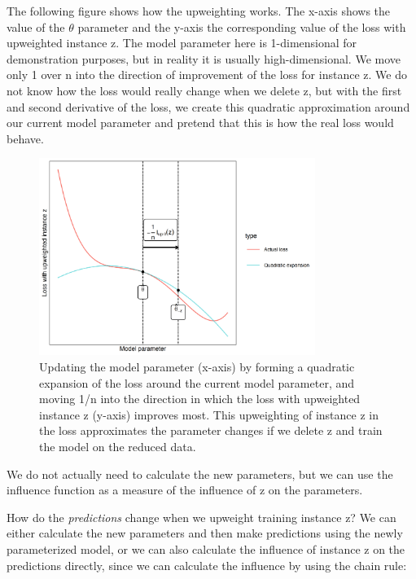 \documentclass[
  10pt,
]{scrbook}
\begin{document}
The following figure shows how the upweighting works.
The x-axis shows the value of the \(\theta\) parameter and the y-axis the corresponding value of the loss with upweighted instance z.
The model parameter here is 1-dimensional for demonstration purposes, but in reality it is usually high-dimensional.
We move only 1 over n into the direction of improvement of the loss for instance z.
We do not know how the loss would really change when we delete z, but with the first and second derivative of the loss, we create this quadratic approximation around our current model parameter and pretend that this is how the real loss would behave.

\begin{figure}

{\centering \includegraphics[width=0.8\textwidth]{images/quadratic-expansion-1} 

}

\caption{Updating the model parameter (x-axis) by forming a quadratic expansion of the loss around the current model parameter, and moving 1/n into the direction in which the loss with upweighted instance z (y-axis) improves most. This upweighting of instance z in the loss approximates the parameter changes if we delete z and train the model on the reduced data.}\label{fig:quadratic-expansion}
\end{figure}

We do not actually need to calculate the new parameters, but we can use the influence function as a measure of the influence of z on the parameters.

How do the \emph{predictions} change when we upweight training instance z?
We can either calculate the new parameters and then make predictions using the newly parameterized model, or we can also calculate the influence of instance z on the predictions directly, since we can calculate the influence by using the chain rule:
\end{document}
